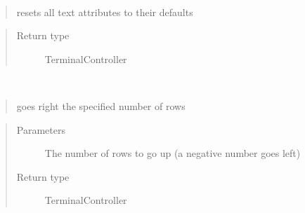 \documentclass[a4paper,10pt,english]{sphinxmanual}
\begin{document}
\begin{fulllineitems}
\begin{fulllineitems}
\begin{quote}
\begin{description}
\end{description}\end{quote}

\end{fulllineitems}


\begin{fulllineitems}
\label{\detokenize{api/termtools.terminal.TerminalController:termtools.terminal.TerminalController.reset_attributes}}~\begin{quote}

resets all text attributes to their defaults
\end{quote}
\begin{quote}\begin{description}
\item[{Return type}] \leavevmode
TerminalController

\end{description}\end{quote}

\end{fulllineitems}


\begin{fulllineitems}
\label{\detokenize{api/termtools.terminal.TerminalController:termtools.terminal.TerminalController.right}}~\begin{quote}

goes right the specified number of rows
\end{quote}
\begin{quote}\begin{description}
\item[{Parameters}] \leavevmode
{} \textendash{} The number of rows to go up (a negative number goes left)

\item[{Return type}] \leavevmode
TerminalController

\end{description}\end{quote}

\end{fulllineitems}



\end{fulllineitems}
\end{document}
